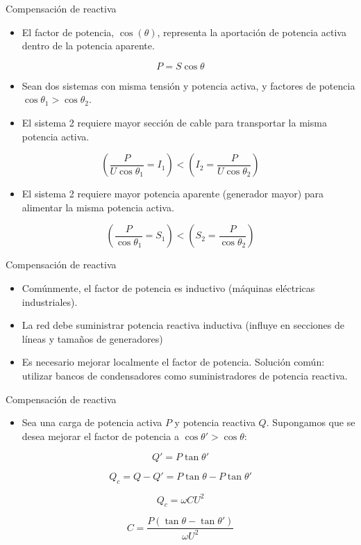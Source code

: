 \documentclass[xcolor={usenames,svgnames,dvipsnames}]{beamer}
\begin{document}
\begin{frame}[label={sec:org83c7945}]{Compensación de reactiva}
\begin{itemize}
\item El factor de potencia, \(\cos(\theta)\), representa la aportación de potencia activa dentro de la potencia aparente.
\end{itemize}
\[
P = S \cos \theta
\]

\begin{itemize}
\item Sean dos sistemas con misma tensión y potencia activa, y factores de potencia \(\cos \theta_1 > \cos \theta_2\).

\item El sistema 2 requiere \alert{mayor sección} de cable para transportar la misma potencia activa.
\end{itemize}
\[
  \left(\frac{P}{U \cos \theta_1} = I_1 \right) < \left( I_2 = \frac{P}{U \cos \theta_2}\right) 
\]
\begin{itemize}
\item El sistema 2 requiere \alert{mayor potencia aparente} (generador mayor) para alimentar la misma potencia activa.
\end{itemize}
\[
  \left(\frac{P}{\cos \theta_1} = S_1 \right) < \left( S_2 = \frac{P}{\cos \theta_2}\right) 
\]
\end{frame}

\begin{frame}[label={sec:org61140ca}]{Compensación de reactiva}
\begin{itemize}
\item Comúnmente, el factor de potencia es \alert{inductivo} (máquinas eléctricas
industriales).

\item La red debe suministrar potencia reactiva inductiva (influye en secciones de líneas y tamaños de generadores)

\item Es necesario mejorar \alert{localmente} el factor de potencia. Solución
común: utilizar \alert{bancos de condensadores} como suministradores de
potencia reactiva.
\end{itemize}
\end{frame}

\begin{frame}[label={sec:org7ac5e23}]{Compensación de reactiva}
\begin{itemize}
\item Sea una carga de potencia activa \(P\) y potencia reactiva \(Q\). Supongamos que se desea mejorar el factor de potencia a \(\cos \theta' > \cos \theta\):
\end{itemize}

\[
  Q' = P \tan \theta'
\]

\[
  Q_c = Q - Q' = P \tan \theta - P \tan \theta'
\]

\[
  Q_c = \omega C U^2
\]

\[
C = \frac{P (\tan \theta - \tan \theta')}{\omega U^2}
\]
\end{frame}
\end{document}

